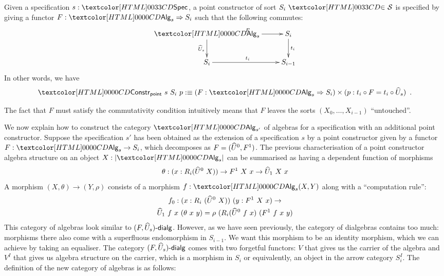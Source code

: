 \begin{definition}
  Given a specification $s : \specty$, a point constructor of sort
  $\sortsin{S_i}{\Ss}$ is specified by giving a functor
  $F : \Func{\Alg_s}{S_i}$ such that the following commutes:
  $$
  \xymatrix{
    \Alg_s \ar[r]^{F} \ar[d]_{\extendfunc{U}_s} &S_i \ar[d]^{t_i} \\
    S_i \ar[r]^{t_i} &S_{i-1}
  }
  $$
  In other words, we have
  $$
  \Constr_{\ident{point}}\ s\ S_i\ p \ddefeq (F : \Func{\Alg_s}{S_i}) \times (p : t_i \circ F = t_i \circ \extendfunc{U}_s) \enspace .
  $$
\end{definition} 

The fact that $F$ must satisfy the commutativity condition intuitively
means that $F$ leaves the sorts $(X_0, \hdots, X_{i-1})$ ``untouched''.

We now explain how to construct the category $\Alg_{s'}$ of algebras
for a specification with an additional point constructor. Suppose
the specification $s'$ has been obtained as the extension of a
specification $s$ by a point constructor given by a functor
$F : \Alg_s \to S_i$, which decomposes as $F = (\widehat{U}^0, F^1)$. The
previous characterisation of a point constructor algebra structure on
an object $X : | \Alg_s |$ can be summarised as having a dependent
function of morphisms
\[
\theta : (x : R_i (\extendfunc{U}^0\ X)) \to F^1\ X\ x \to \extendfunc{U}_1\ X\ x
\]
A morphism $(X,\theta) \to (Y,\rho)$ consists of a morphism
$f : \Alg_s(X,Y)$ along with a ``computation rule'':
\begin{multline*}
f_0 : (x : R_i \ (\extendfunc{U}^0\ X))\ (y : F^1\ X\ x) \to \\ 
\extendfunc{U}_1\ f\ x\ (\theta\ x\ y) = \rho\ (R_i(\extendfunc{U}^0\ f\ x)\ (F^1\ f\ x\ y)
\end{multline*}
This category of algebras look similar to
$\dialgcat{F}{\extendfunc{U}_s}$. However, as we have seen previously, the
category of dialgebras contains too much: morphisms there also come
with a superfluous endomorphism in $S_{i-1}$. We want this morphism to
be an identity morphism, which we can achieve by taking an
equaliser. The category $\dialgcat{F}{\extendfunc{U}_s}$ comes with two
forgetful functors: $V$ that gives us the carrier of the algebra and
$V^I$ that gives us algebra structure on the carrier, which is a
morphism in $S_i$ or equivalently, an object in the arrow category
$S_i^I$. The definition of the new category of algebras is as follows:

